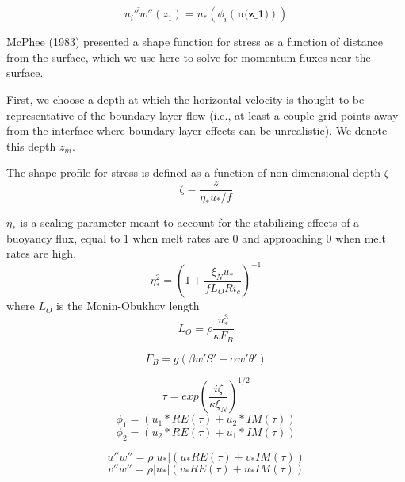     \begin{equation*}
    \overline{u_i''w''}(z_1) = u_* (\phi_i(\textbf{u(z_1)}))
    \end{equation*}

    McPhee (1983) presented a shape function for stress as a function of distance from the surface, which we use here to solve for momentum fluxes near the surface. 
    
    First, we choose a depth at which the horizontal velocity is thought to be representative of the boundary layer flow (i.e., at least a couple grid points away from the interface where boundary layer effects can be unrealistic). We denote this depth $z_m$. 
    
    The shape profile for stress is defined as a function of non-dimensional depth $\zeta$
    \begin{equation}
        \zeta = \frac{z}{\eta_* u_*/f}
    \end{equation}
    
    $\eta_*$ is a scaling parameter meant to account for the stabilizing effects of a buoyancy flux, equal to 1 when melt rates are 0 and approaching 0 when melt rates are high.
    \begin{equation}
        \eta_*^2 = (1+\frac{\xi_N u_*}{f L_O Ri_c})^{-1}
    \end{equation}
    where $L_O$ is the Monin-Obukhov length
    \begin{equation}
        L_O = \rho \frac{u_*^3}{\kappa F_B}
    \end{equation}
    
    \begin{equation}
	F_B = g(\beta w'S' - \alpha w'\theta')
	\end{equation}

    \begin{equation}
        \tau = exp(\frac{i \zeta}{\kappa \xi_N})^{1/2}
    \end{equation}
    \begin{equation}
        \phi_1 = (u_1* RE(\tau) + u_2* IM(\tau))
    \end{equation}
    \begin{equation}
        \phi_2 = (u_2* RE(\tau) + u_1* IM(\tau))
    \end{equation}

    \begin{equation}
        u''w'' = \rho |u_*| (u_* RE(\tau) + v_* IM(\tau))
    \end{equation}
    \begin{equation}
        v''w'' = \rho |u_*|(v_* RE(\tau) + u_* IM(\tau))
    \end{equation}

